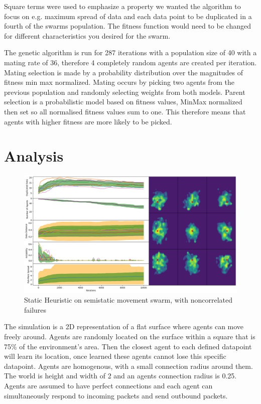 \documentclass{UoYCSproject}
\begin{document}
Square terms were used to emphasize a property we wanted the algorithm to focus on e.g. maximum spread of data and each data point to be duplicated in a fourth of the swarms population. 
The fitness function would need to be changed for different characteristics you desired for the swarm.

The genetic algorithm is run for 287 iterations with a population size of 40 with a mating rate of 36, therefore 4 completely random agents are created per iteration. 
Mating selection is made by a probability distribution over the magnitudes of fitness min max normalized.
Mating occurs by picking two agents from the previous population and randomly selecting weights from both models.
Parent selection is a probabilistic model based on fitness values, MinMax normalized then set so all normalised fitness values sum to one.
This therefore means that agents with higher fitness are more likely to be picked.




\chapter{Analysis}
\label{cha:Analysis}

\begin{figure}[htb]
\label{fig:static_movement_non}
\begin{center}
\centering
\includegraphics[width=\linewidth]{"./Static_Heuristic/Static_Movement_non.png"}
\caption{Static Heuristic on semi\-static movement swarm, with non\-correlated failures}
\end{center}
\end{figure}

The simulation is a 2D representation of a flat surface where agents can move freely around.
Agents are randomly located on the surface within a square that is 75\% of the environment's area.
Then the closest agent to each defined datapoint will learn its location, once learned these agents cannot lose this specific datapoint.
Agents are homogenous, with a small connection radius around them.
The world is height and width of 2 and an agents connection radius is 0.25.
Agents are assumed to have perfect connections and each agent can simultaneously respond to incoming packets and send outbound packets.
\end{document}

